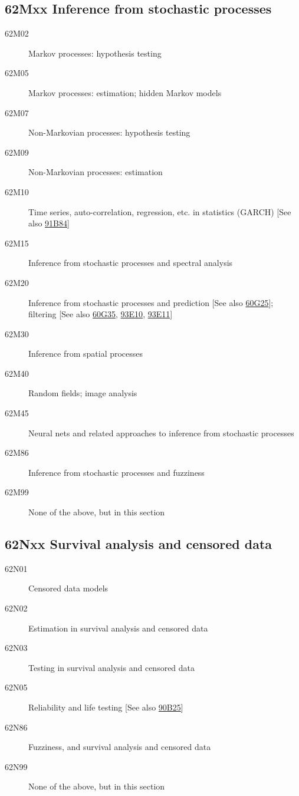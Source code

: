 \documentclass[letterpaper]{article}
\begin{document}
\subsection*{62Mxx  Inference from stochastic processes }\label{62Mxx}
\begin{description}  
\item [62M02]\label{62M02} Markov processes: hypothesis testing
\item [62M05]\label{62M05} Markov processes: estimation; hidden Markov models
\item [62M07]\label{62M07} Non-Markovian processes: hypothesis testing
\item [62M09]\label{62M09} Non-Markovian processes: estimation
\item [62M10]\label{62M10} Time series, auto-correlation, regression, etc. in statistics (GARCH) [See also \hyperref[91B84]{91B84}]
\item [62M15]\label{62M15} Inference from stochastic processes and spectral analysis 
\item [62M20]\label{62M20} Inference from stochastic processes and prediction [See also \hyperref[60G25]{60G25}]; filtering [See also \hyperref[60G35]{60G35}, \hyperref[93E10]{93E10}, \hyperref[93E11]{93E11}]
\item [62M30]\label{62M30} Inference from spatial processes
\item [62M40]\label{62M40} Random fields; image analysis
\item [62M45]\label{62M45} Neural nets and related approaches to inference from stochastic processes
\item [62M86]\label{62M86} Inference from stochastic processes and fuzziness
\item [62M99]\label{62M99} None of the above, but in this section
\end{description}
\subsection*{62Nxx  Survival analysis and censored data }\label{62Nxx}
\begin{description}  
\item [62N01]\label{62N01} Censored data models
\item [62N02]\label{62N02} Estimation in survival analysis and censored data
\item [62N03]\label{62N03} Testing in survival analysis and censored data
\item [62N05]\label{62N05} Reliability and life testing [See also \hyperref[90B25]{90B25}]
\item [62N86]\label{62N86} Fuzziness, and survival analysis and censored data
\item [62N99]\label{62N99} None of the above, but in this section
\end{description}
\end{document}
